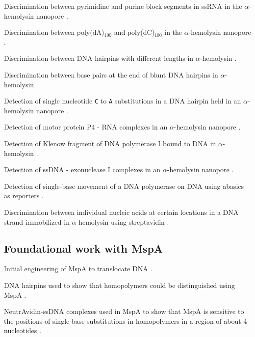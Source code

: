 Discrimination between pyrimidine and purine block segments in ssRNA in the $\alpha$-hemolysin nanopore \citep{Akeson1999}.

Discrimination between poly(dA)$_{100}$ and poly(dC)$_{100}$ in the $\alpha$-hemolysin nanopore \citep{Meller2000, Meller2002}.

Discrimination between DNA hairpins with different lengths in $\alpha$-hemolysin \citep{Vercoutere2001}.

Discrimination between base pairs at the end of blunt DNA hairpins in $\alpha$-hemolysin \citep{Vercoutere2003}.

Detection of single nucleotide \texttt{C} to \texttt{A} substitutions in a DNA hairpin held in an $\alpha$-hemolysin nanopore \citep{Ashkenasy2005}.

Detection of motor protein P4 - RNA complexes in an $\alpha$-hemolysin nanopore \citep{Astier2007}.

Detection of Klenow fragment of DNA polymerase I bound to DNA in $\alpha$-hemolysin \citep{Benner2007}.

Detection of ssDNA - exonuclease I complexes in an $\alpha$-hemolysin nanopore \citep{Hornblower2007}.

Detection of single-base movement of a DNA polymerase on DNA using abasics as reporters \citep{Cockroft2008}.

Discrimination between individual nucleic acids at certain locations in a DNA strand immobilized in $\alpha$-hemolysin using streptavidin \citep{Stoddart2009}.

\subsection{Foundational work with MspA}

Initial engineering of MspA to translocate DNA \citep{Butler2008}.

DNA hairpins used to show that homopolymers could be distinguished using MspA \citep{Derrington2010}.

NeutrAvidin-ssDNA complexes used in MspA to show that MspA is sensitive to the positions of single base substitutions in homopolymers in a region of about 4 nucleotides \citep{Manrao2011}.

